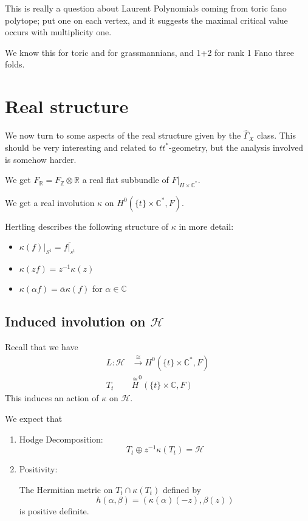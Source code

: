 \documentclass{amsart}
\theoremstyle{definition}
\newcommand{\Z}{\mathbb{Z}}
\newcommand{\R}{\mathbb{R}}
\newcommand{\C}{\mathbb{C}}
\begin{document}
This is really a question about Laurent Polynomials coming from toric fano polytope; put one on each vertex, and it suggests the maximal critical value occurs with multiplicity one.

We know this for toric and for grassmannians, and 1+2 for rank 1 Fano three folds.

\section{Real structure}

We now turn to some aspects of the real structure given by the $\widehat{\Gamma}_X$ class.  This should be very interesting and related to $tt^*$-geometry, but the analysis involved is somehow harder.

We get $F_\R=F_\Z\otimes\R$ a real flat subbundle of $F|_{H\times\C^*}$.  

We get a real involution $\kappa$ on $H^0(\{t\}\times\C^*, F)$.  

Hertling describes the following structure of $\kappa$ in more detail:
\begin{itemize}
\item $\kappa(f)|_{S^1}=\overline{f|_{s^1}}$\
\item $\kappa(zf)=z^{-1}\kappa(z)$
\item $\kappa(\alpha f)=\overline{\alpha}\kappa(f)$ for $\alpha\in \C$
\end{itemize}

\subsection{Induced involution on $\mathcal{H}$}
Recall that we have
\begin{align*}
L:\mathcal{H}&\stackrel{\cong}\to H^0(\{t\}\times\C^*, F) \\
T_t&\stackrel{\cong} H^0(\{t\}\times\C, F) 
\end{align*}
This induces an action of $\kappa$ on $\mathcal{H}$.

We expect that
\begin{enumerate}
\item Hodge Decomposition:
$$T_t\oplus z^{-1}\kappa(T_t)=\mathcal{H}$$
\item Positivity: 

The Hermitian metric on $T_t\cap \kappa(T_t)$ defined by 
$$h(\alpha,\beta)=\left(\kappa(\alpha)(-z),\beta(z)\right)$$
is positive definite.
\end{enumerate}
\end{document}
